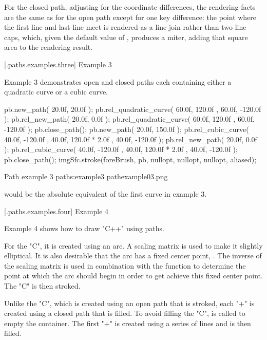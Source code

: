 \pnum
For the closed path, adjusting for the coordinate differences, the rendering facts are the same as for the open path except for one key difference: the point where the first line and last line meet is rendered as a line join rather than two line caps, which, given the default value of , produces a miter, adding that square area to the rendering result.

 [\iotwod.paths.examples.three] {Example 3}

\pnum
Example 3 demonstrates open and closed paths each containing either a quadratic curve or a cubic curve.

\begin{codeblock}
pb.new_path({ 20.0f, 20.0f });
pb.rel_quadratic_curve({ 60.0f, 120.0f }, { 60.0f, -120.0f });
pb.rel_new_path({ 20.0f, 0.0f });
pb.rel_quadratic_curve({ 60.0f, 120.0f }, { 60.0f, -120.0f });
pb.close_path();
pb.new_path({ 20.0f, 150.0f });
pb.rel_cubic_curve({ 40.0f, -120.0f }, { 40.0f, 120.0f * 2.0f },
  { 40.0f, -120.0f });
pb.rel_new_path({ 20.0f, 0.0f });
pb.rel_cubic_curve({ 40.0f, -120.0f }, { 40.0f, 120.0f * 2.0f },
  { 40.0f, -120.0f });
pb.close_path();
imgSfc.stroke(foreBrush, pb, nullopt, nullopt, nullopt, aliased);
\end{codeblock}

\begin{importgraphiciotwod}
{Path example 3}
{paths:example3}
{pathexample03.png}
\end{importgraphiciotwod}

\FloatBarrier

\pnum
\begin{note}
 would be the absolute equivalent of the first curve in example 3.
\end{note}

 [\iotwod.paths.examples.four] {Example 4}

\pnum
Example 4 shows how to draw "C++" using paths.

\pnum
For the "C", it is created using an arc. A scaling matrix is used to make it  slightly elliptical. It is also desirable that the arc has a fixed center point, . The inverse of the scaling matrix is used in combination with the  function to determine the point at which the arc should begin in order to get achieve this fixed center point. The "C" is then stroked.

\pnum
Unlike the "C", which is created using an open path that is stroked, each "+" is created using a closed path that is filled. To avoid filling the "C",  is called to empty the container. The first "+" is created using a series of lines and is then filled.

